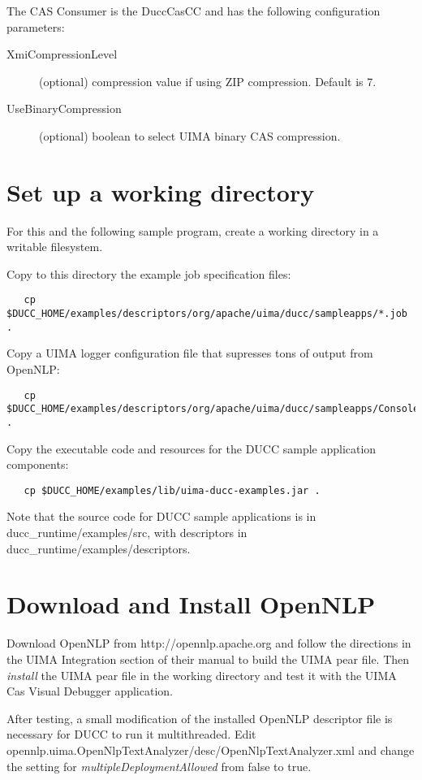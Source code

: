 The CAS Consumer is the DuccCasCC and has the following configuration parameters:

\begin{description}
  \item[XmiCompressionLevel] (optional) compression value if using ZIP compression. Default is 7.
  \item[UseBinaryCompression] (optional) boolean to select UIMA binary CAS compression.
\end{description}

\section{Set up a working directory}
For this and the following sample program, create a working directory in a writable filesystem.

Copy to this directory the example job specification files:
\begin{verbatim}
   cp $DUCC_HOME/examples/descriptors/org/apache/uima/ducc/sampleapps/*.job .
\end{verbatim}

Copy a UIMA logger configuration file that supresses tons of output from OpenNLP:
\begin{verbatim}
   cp $DUCC_HOME/examples/descriptors/org/apache/uima/ducc/sampleapps/ConsoleLogger.properties .
\end{verbatim}

Copy the executable code and resources for the DUCC sample application components:
\begin{verbatim}
   cp $DUCC_HOME/examples/lib/uima-ducc-examples.jar .
\end{verbatim}

Note that the source code for DUCC sample applications is in ducc\_runtime/examples/src,
with descriptors in ducc\_runtime/examples/descriptors.

\section{Download and Install OpenNLP}
Download OpenNLP from http://opennlp.apache.org and follow the directions in the
UIMA Integration section of their manual to build the UIMA pear file.
Then {\em install} the UIMA pear file in the working directory and
test it with the UIMA Cas Visual Debugger application.

After testing, a small modification of the installed OpenNLP descriptor file
is necessary for DUCC to run it multithreaded. 
Edit opennlp.uima.OpenNlpTextAnalyzer/desc/OpenNlpTextAnalyzer.xml
and change the setting for {\em multipleDeploymentAllowed} from false to true.

